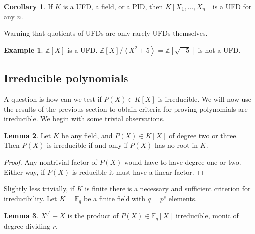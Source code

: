 \documentclass{article}
\newcommand{\F}{\mathbb{F}}
\newcommand{\Z}{\mathbb{Z}}
\newcommand{\rb}[1]{\left( #1 \right)}
\renewcommand{\sb}[1]{\left[ #1 \right]}
\newcommand{\ab}[1]{\left\langle #1 \right\rangle}
\theoremstyle{definition}\newtheorem{definition}{Definition}[subsection]
\theoremstyle{definition}\newtheorem{remark}[definition]{Remark}
\theoremstyle{definition}\newtheorem*{example}{Example}
\theoremstyle{definition}\newtheorem*{note}{Note}
\newtheorem{lemma}[definition]{Lemma}
\newtheorem{corollary}[definition]{Corollary}
\begin{document}
\begin{corollary}
If $ K $ is a UFD, a field, or a PID, then $ K\sb{X_1, \dots, X_n} $ is a UFD for any $ n $.
\end{corollary}

Warning that quotients of UFDs are only rarely UFDs themselves.

\begin{example}
$ \Z\sb{X} $ is a UFD. $ \Z\sb{X} / \ab{X^2 + 5} = \Z\sb{\sqrt{-5}} $ is not a UFD.
\end{example}


\subsection{Irreducible polynomials}

A question is how can we test if $ P\rb{X} \in K\sb{X} $ is irreducible. We will now use the results of the previous section to obtain criteria for proving polynomials are irreducible. We begin with some trivial observations.

\begin{lemma}
Let $ K $ be any field, and $ P\rb{X} \in K\sb{X} $ of degree two or three. Then $ P\rb{X} $ is irreducible if and only if $ P\rb{X} $ has no root in $ K $.
\end{lemma}

\begin{proof}
Any nontrivial factor of $ P\rb{X} $ would have to have degree one or two. Either way, if $ P\rb{X} $ is reducible it must have a linear factor.
\end{proof}

Slightly less trivially, if $ K $ is finite there is a necessary and sufficient
criterion for irreducibility. Let $ K = \F_q $ be a finite field with $ q = p^s $ elements.

\begin{lemma}
$ X^{q^r} - X $ is the product of $ P\rb{X} \in \F_q\sb{X} $ irreducible, monic of degree dividing $ r $.
\end{lemma}
\end{document}
